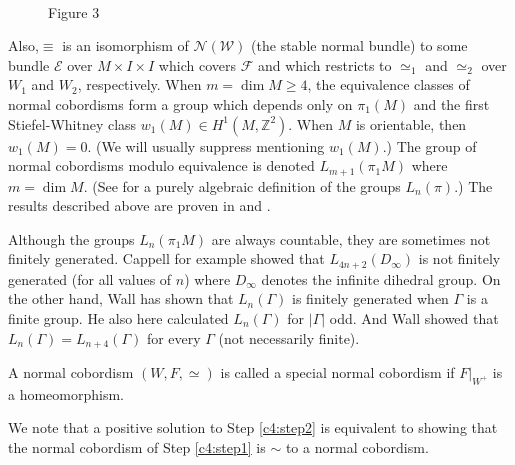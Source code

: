 \begin{figure}[H]
  \\
  Figure 3
\end{figure}

Also,\pageoriginale $\equiv$ is an isomorphism of $\mathcal{N} (\mathcal{W})$ (the
stable normal bundle) to some bundle $\mathcal{E}$ over $M \times I
\times I$ which covers $\mathcal{F}$ and which restricts to $\simeq_1$
and $\simeq_2$ over $W_1$ and $W_2$, respectively. When $m = \dim
M\geq 4$, the equivalence classes of normal cobordisms form a group
which depends only on $\pi_1 (M)$ and the first Stiefel-Whitney class
$w_1 (M) \in H^1 (M, \mathbb{Z}^2)$. When $M$ is orientable, then $w_1
(M) =0$. (We will usually suppress mentioning $w_1 (M)$.) The group of
normal cobordisms modulo equivalence is denoted $L_{m+1} (\pi_1 M)$
where $m= \dim M$. (See \cite{96} for a purely algebraic definition of
the groups $L_n(\pi)$.) The results described above are proven in
\cite{96} and \cite{67}.

\begin{remark*}
  Although the groups $L_n (\pi_1 M)$ are always countable, they are
  sometimes not finitely generated. Cappell \cite{16} for example
  showed that $L_{4n+2} (D_\infty)$ is not finitely generated (for all
  values of $n$) where $D_\infty$ denotes the infinite dihedral
  group. On the other hand, Wall \cite{97} has shown that $L_n
  (\Gamma)$ is finitely generated when $\Gamma$ is a finite group. He
  also here calculated $L_n (\Gamma)$ for $|\Gamma|$ odd. And Wall
  \cite{96} showed that $L_n (\Gamma) = L_{n+4}(\Gamma)$ for every
  $\Gamma$ (not necessarily finite). 
\end{remark*}

\begin{defi}\label{c4:defi4.1}
  A normal cobordism $(W, F, \simeq)$ is called a special normal
  cobordism if $F|_{W^+}$ is a homeomorphism.
\end{defi}

We note that a positive solution to Step \ref{c4:step2} is equivalent
to showing that the normal cobordism of Step \ref{c4:step1} is $\sim$
to a normal cobordism.

